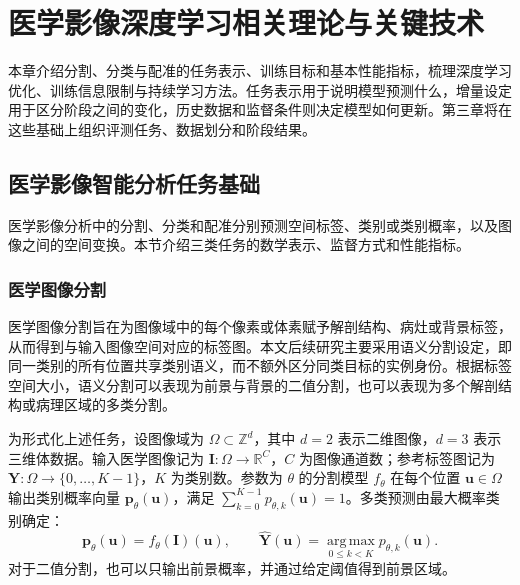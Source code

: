 \chapter{医学影像深度学习相关理论与关键技术}
\label{chap:foundations}

本章介绍分割、分类与配准的任务表示、训练目标和基本性能指标，梳理深度学习优化、训练信息限制与持续学习方法。任务表示用于说明模型预测什么，增量设定用于区分阶段之间的变化，历史数据和监督条件则决定模型如何更新。第三章将在这些基础上组织评测任务、数据划分和阶段结果。

\section{医学影像智能分析任务基础}
\label{sec:foundations-tasks}

医学影像分析中的分割、分类和配准分别预测空间标签、类别或类别概率，以及图像之间的空间变换\cite{litjens2017survey}。本节介绍三类任务的数学表示、监督方式和性能指标。

\subsection{医学图像分割}
\label{subsec:foundations-segmentation}

医学图像分割旨在为图像域中的每个像素或体素赋予解剖结构、病灶或背景标签，从而得到与输入图像空间对应的标签图\cite{litjens2017survey,ronneberger2015unet}。本文后续研究主要采用语义分割设定，即同一类别的所有位置共享类别语义，而不额外区分同类目标的实例身份。根据标签空间大小，语义分割可以表现为前景与背景的二值分割，也可以表现为多个解剖结构或病理区域的多类分割。

为形式化上述任务，设图像域为 $\Omega\subset\mathbb{Z}^{d}$，其中 $d=2$ 表示二维图像，$d=3$ 表示三维体数据。输入医学图像记为 $\mathbf{I}:\Omega\rightarrow\mathbb{R}^{C}$，$C$ 为图像通道数；参考标签图记为 $\mathbf{Y}:\Omega\rightarrow\{0,\ldots,K-1\}$，$K$ 为类别数。参数为 $\theta$ 的分割模型 $f_{\theta}$ 在每个位置 $\mathbf{u}\in\Omega$ 输出类别概率向量 $\mathbf{p}_{\theta}(\mathbf{u})$，满足 $\sum_{k=0}^{K-1}p_{\theta,k}(\mathbf{u})=1$。多类预测由最大概率类别确定：
\begin{equation}
\mathbf{p}_{\theta}(\mathbf{u})=f_{\theta}(\mathbf{I})(\mathbf{u}),\qquad
\widehat{\mathbf{Y}}(\mathbf{u})
=\operatorname*{arg\,max}_{0\leq k<K}p_{\theta,k}(\mathbf{u}).
\label{eq:foundations-seg-prediction}
\end{equation}
对于二值分割，也可以只输出前景概率，并通过给定阈值得到前景区域。

